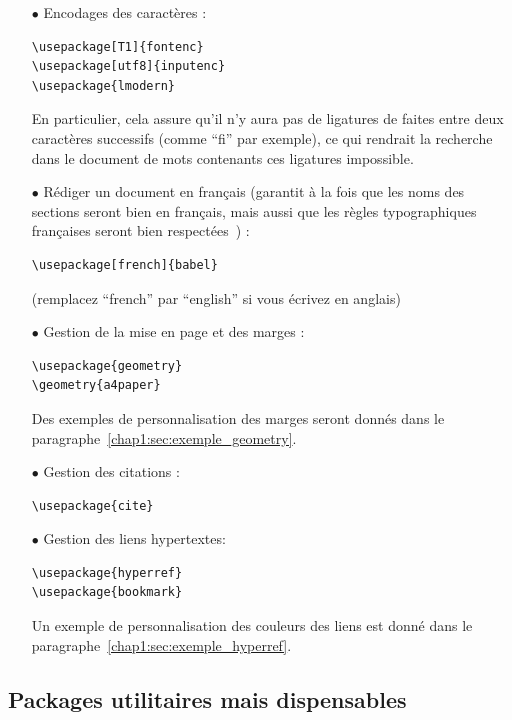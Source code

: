 \begin{itemize}
\item[$\bullet$] Encodages des caractères :
\begin{verbatim}
\usepackage[T1]{fontenc}
\usepackage[utf8]{inputenc}
\usepackage{lmodern}
\end{verbatim}
En particulier, cela assure qu'il n'y aura pas de ligatures de faites entre deux caractères successifs (comme ``fi'' par exemple), ce qui rendrait la recherche dans le document de mots contenants ces ligatures impossible.
\item[$\bullet$] Rédiger un document en français (garantit à la fois que les noms des sections seront bien en français, mais aussi que les règles typographiques françaises seront bien respectées~\cite{frenchb}) :
\begin{verbatim}
\usepackage[french]{babel}
\end{verbatim}
(remplacez ``french'' par ``english'' si vous écrivez en anglais)
\item[$\bullet$] Gestion de la mise en page et des marges :
\begin{verbatim}
\usepackage{geometry} 
\geometry{a4paper}
\end{verbatim}
Des exemples de personnalisation des marges seront donnés dans le paragraphe~\ref{chap1:sec:exemple_geometry}.
\item[$\bullet$] Gestion des citations :
\begin{verbatim}
\usepackage{cite} 
\end{verbatim}
\item[$\bullet$] Gestion des liens hypertextes:
\begin{verbatim}
\usepackage{hyperref}
\usepackage{bookmark}
\end{verbatim}
Un exemple de personnalisation des couleurs des liens est donné dans le paragraphe~\ref{chap1:sec:exemple_hyperref}.
\end{itemize}

\subsection{Packages utilitaires mais dispensables}

